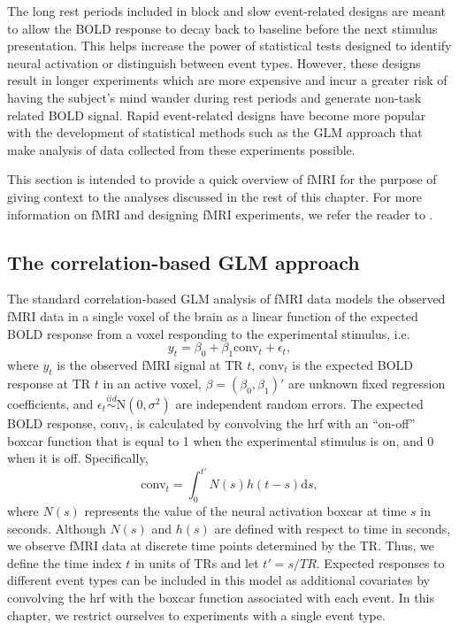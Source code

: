 The long rest periods included in block and slow event-related designs are meant to allow the BOLD response to decay back to baseline before the next stimulus presentation. This helps increase the power of statistical tests designed to identify neural activation or distinguish between event types. However, these designs result in longer experiments which are more expensive and incur a greater risk of having the subject's mind wander during rest periods and generate non-task related BOLD signal. Rapid event-related designs have become more popular with the development of statistical methods such as the GLM approach that make analysis of data collected from these experiments possible.

This section is intended to provide a quick overview of fMRI for the purpose of giving context to the analyses discussed in the rest of this chapter. For more information on fMRI and designing fMRI experiments, we refer the reader to \citet{ashby:fmri:2011,pold:fmri:2011}.

\subsection{The correlation-based GLM approach \label{sec:fmri:glm}}

The standard correlation-based GLM analysis of fMRI data models the observed fMRI data in a single voxel of the brain as a linear function of the expected BOLD response from a voxel responding to the experimental stimulus, i.e.
\begin{equation}
y_t = \beta_0 + \beta_1\mbox{conv}_t + \epsilon_t, \label{eqn:fmri:glm}
\end{equation}
where $y_t$ is the observed fMRI signal at TR $t$, $\mbox{conv}_t$ is the expected BOLD response at TR $t$ in an active voxel, $\beta = (\beta_0,\beta_1)'$ are unknown fixed regression coefficients, and $\epsilon_t \stackrel{iid}{\sim} \mbox{N}(0,\sigma^2)$ are independent random errors. The expected BOLD response, $\mbox{conv}_t$, is calculated by convolving the hrf with an ``on-off'' boxcar function that is equal to 1 when the experimental stimulus is on, and 0 when it is off. Specifically,
\begin{equation}
\mbox{conv}_t = \int_0^{t'} N(s)h(t-s)\mbox{d}s, \label{eqn:fmri:conv}
\end{equation}
where $N(s)$ represents the value of the neural activation boxcar at time $s$ in seconds. Although $N(s)$ and $h(s)$ are defined with respect to time in seconds, we observe fMRI data at discrete time points determined by the TR. Thus, we define the time index $t$ in units of TRs and let $t' = s / TR$. Expected responses to different event types can be included in this model as additional covariates by convolving the hrf with the boxcar function associated with each event. In this chapter, we restrict ourselves to experiments with a single event type.

